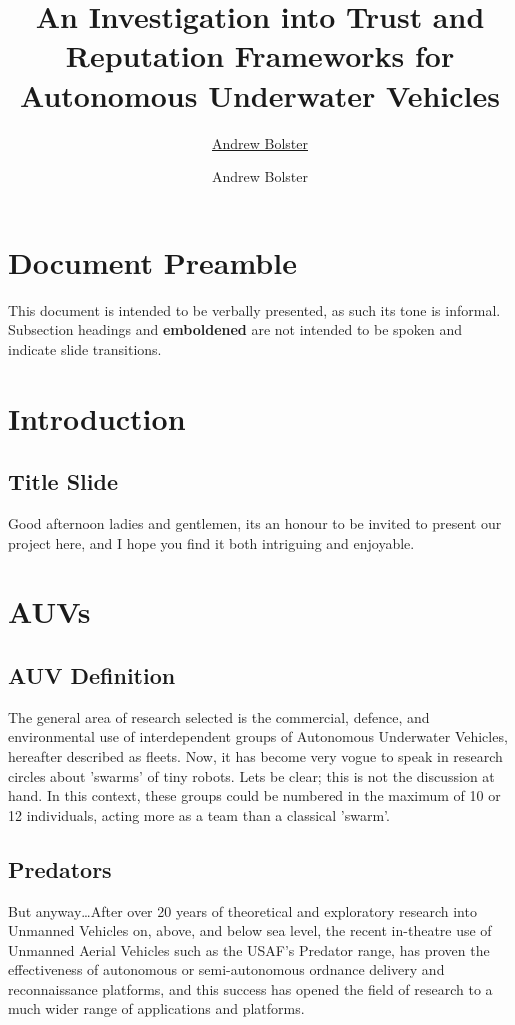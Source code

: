 \documentclass[oneside,11pt,a4paper]{Latex/Classes/PhDthesisPSnPDF}
\title{An Investigation into Trust and Reputation Frameworks for Autonomous Underwater Vehicles}
\author{\href{mailto:me@andrewbolster.info}{Andrew Bolster}}
\author{Andrew Bolster}
\begin{document}
\maketitle  %
\begin{doublespace}
\section{Document Preamble}
This document is intended to be verbally presented, as such its tone is
informal.
Subsection headings and \textbf{emboldened} are not intended to be spoken and
indicate slide transitions.
\section{Introduction}
\subsection{Title Slide} 
Good afternoon ladies and gentlemen, its an honour to be
invited to present our project here, and I hope you find it both intriguing and
enjoyable.

\section{AUVs}
\subsection{AUV Definition}
The general area of research selected is the
commercial, defence, and environmental use of interdependent groups of
Autonomous Underwater Vehicles, hereafter described as fleets. Now, it has
become very vogue to speak in research circles about 'swarms' of tiny robots.
Lets be clear; this is not the discussion at hand. In this context, these groups
could be numbered in the maximum of 10 or 12 individuals, acting more as a team
than a classical 'swarm'.

\subsection{Predators} But anyway\ldots After over 20 years of theoretical and
exploratory research into Unmanned Vehicles on, above, and below sea level, the recent
in-theatre use of Unmanned Aerial Vehicles such as the USAF's Predator range,
has proven the effectiveness of autonomous or semi-autonomous ordnance delivery and reconnaissance platforms,
and this success has opened the field of research to a much wider range of
applications and platforms.


\end{doublespace}
\end{document}

